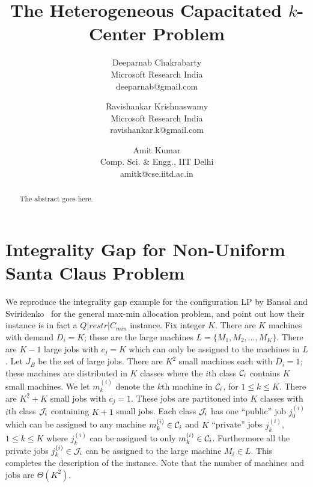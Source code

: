 \documentclass{article}[11pt]
\begin{document}
\title{\huge The Heterogeneous Capacitated $k$-Center Problem}
\date{}
\author{Deeparnab Chakrabarty \\ \small Microsoft Research India\\\small  deeparnab@gmail.com \and Ravishankar Krishnaswamy \\ \small Microsoft Research India\\\small  ravishankar.k@gmail.com \and Amit Kumar \\ \small  Comp. Sci. \& Engg., IIT Delhi \\ \small amitk@cse.iitd.ac.in}
\maketitle
\begin{abstract}
	The abstract goes here.
\end{abstract}
\thispagestyle{empty}
\newpage
\setcounter{page}{1}











\newpage
\appendix


\section{Integrality Gap for Non-Uniform Santa Claus Problem}
We reproduce the integrality gap example for the configuration LP by Bansal and Sviridenko~\cite{BS} for the general max-min allocation problem, and point out how their instance is in fact a $Q|restr|C_{min}$ instance.
Fix integer $K$. There are $K$ machines with demand $D_i = K$; these are the large machines $L = \{M_1,M_2,\ldots,M_K\}$. There are $K-1$ large jobs with $c_j = K$ which can only be assigned to the machines in $L$.
Let $J_B$ be the set of large jobs. There are $K^2$ small machines each with $D_i = 1$; these machines are distributed in $K$ classes where the $i$th class ${\cal C}_i$ contains $K$ small machines. We let $m^{(i)}_k$ denote the $k$th machine in ${\cal C}_i$, for $1\leq k\leq K$.
There are $K^2 + K$ small jobs with $c_j = 1$. These jobs are partitoned into $K$ classes with $i$th class ${\cal J}_i$ containing $K+1$ small jobs. Each class ${\cal J}_i$ has one ``public'' job $j^{(i)}_0$ which can be assigned to any machine $m^{(i)}_k \in {\cal C}_i$
 and $K$ ``private'' jobs $j^{(i)}_k$, $1\leq k\leq K$ where $j^{(i)}_k$ can be assigned to only $m^{(i)}_k \in {\cal C}_i$. Furthermore all the private jobs $j^{(i)}_k\in {\cal J}_i$ can be assigned to the large machine $M_i \in L$. This completes the description of the instance.
Note that the number of machines and jobs are $\Theta(K^2)$.
\end{document}
